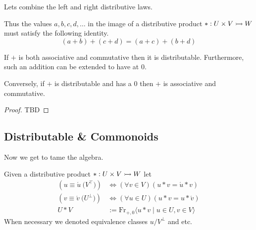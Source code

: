 Lets combine the left and right 
distributive laws.

\begin{center}
\end{center}
Thus the values $a,b,c,d,\ldots $ in the image of a distributive product $*:U\times V\rightarrowtail W$ must 
satisfy the following identity.
\begin{equation}
    \tag{Distributable}
    (a+b)+(c+d) = (a+c)+(b+d)
\end{equation}

\begin{proposition}
    If $+$ is both associative and commutative then it is distributable.
    Furthermore, such an addition can be extended to have at $0$.

    Conversely, if $+$ is distributable and has a $0$ then $+$ is associative 
    and commutative.
\end{proposition}
\begin{proof}
    TBD
\end{proof}



\subsection{Distributable \& Commonoids}

Now we get to tame the algebra.  
\begin{definition}
    Given a distributive product $*:U\times V\rightarrowtail W$
    let 
    \begin{align*}
        (u\equiv \acute{u} \pod{V^{\top}}) & \Leftrightarrow (\forall v\in V)(u*v=\acute{u}*v)\\
        (v\equiv \acute{v} \pod{U^{\bot}}) & \Leftrightarrow (\forall u\in U)(u*v=u*\acute{v})\\
        U*V & := \text{Fr}_{+,0}\langle u*v \mid u\in U, v\in V\rangle
    \end{align*}
    When necessary we denoted equivalence classes $u/{V^{\bot}}$ and etc.
\end{definition}

